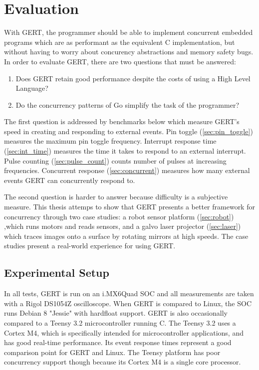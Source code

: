 \chapter{Evaluation}

With GERT, the programmer should be able to implement concurrent embedded programs
which are as performant as the equivalent C implementation, but without having to
worry about concurency abstractions and memory safety bugs. In order to evaluate GERT,
there are two questions that must be answered:

\begin{enumerate}
  \item Does GERT retain good performance despite the costs of using a High Level Language?
  \item Do the concurrency patterns of Go simplify the task of the programmer?
\end{enumerate}

The first question is addressed by benchmarks below which measure GERT's
speed in creating and responding to external events. Pin toggle (\ref{sec:pin_toggle})
measures the maximum pin toggle frequency. Interrupt response time (\ref{sec:int_time})
measures the time it takes to respond to an external interrupt. Pulse counting
(\ref{sec:pulse_count}) counts number of pulses at increasing frequencies.
Concurrent response (\ref{sec:concurrent}) measures how many external events
GERT can concurrently respond to.

The second question is harder to answer because difficulty is a subjective
measure. This thesis attemps to show that GERT presents a better framework for
concurrency through two case studies: a robot sensor platform (\ref{sec:robot})
,which runs motors and reads sensors, and a galvo laser projector (\ref{sec:laser})
which traces images onto a surface by rotating mirrors at high speeds. The case studies
present a real-world experience for using GERT.

\section{Experimental Setup} \label{sec:setup}
In all tests, GERT is run on an i.MX6Quad SOC and all measurements are taken
with a Rigol DS1054Z oscilloscope. When GERT is compared to Linux, the SOC
runs Debian 8 "Jessie" with hardfloat support. GERT is also occasionally
compared to a Teensy 3.2 microcontroller running C. The Teensy 3.2 uses a Cortex M4, which is specifically
intended for microcontroller applications, and has good real-time performance. Its event
response times represent a good comparison point for GERT and Linux. The Teensy platform
has poor concurrency support though because its Cortex M4 is a single core processor.


